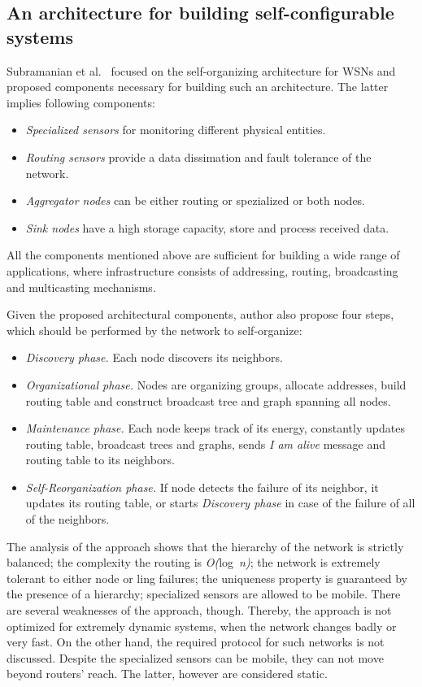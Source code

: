 \subsection{An architecture for building self-configurable systems}

Subramanian et al.~\cite{subramanian00} focused on the self-organizing architecture for WSNs and
proposed components necessary for building such an architecture. The latter
implies following components:

\begin{itemize}
\item \emph{Specialized sensors} for monitoring different physical entities.
\item \emph{Routing sensors} provide a data dissimation and fault tolerance of the network.
\item \emph{Aggregator nodes} can be either routing or spezialized or both nodes.
\item \emph{Sink nodes} have a high storage capacity, store and process received data.
\end{itemize}
All the components mentioned above are sufficient for building a wide range of
applications, where infrastructure consists of addressing, routing, broadcasting
and multicasting mechanisms.

Given the proposed architectural components, author also propose four steps,
which should be performed by the network to self-organize:

\begin{itemize}
\item \emph{Discovery phase.} Each node discovers its neighbors.
\item \emph{Organizational phase.} Nodes are organizing groups, allocate
addresses, build routing table and construct broadcast tree and graph spanning
all nodes.
\item \emph{Maintenance phase.} Each node keeps track of its energy, constantly
updates routing table, broadcast trees and graphs, sends \emph{I am alive}
message and routing table to its neighbors.
\item \emph{Self-Reorganization phase.} If node detects the failure of its
neighbor, it updates its routing table, or starts \emph{Discovery phase} in case
of the failure of all of the neighbors.
\end{itemize}

The analysis of the approach shows that the hierarchy of the network is strictly
balanced; the complexity the routing is \emph{O(}log~\emph{n)}; the network is
extremely tolerant to either node or ling failures; the uniqueness property is
guaranteed by the presence of a hierarchy; specialized sensors are allowed to be
mobile. There are several weaknesses of the approach, though. Thereby,
the approach is not optimized for extremely dynamic systems, when the network
changes badly or very fast. On the other hand, the required protocol for such
networks is not discussed. Despite the specialized sensors can be mobile, they
can not move beyond routers' reach. The latter, however are considered static.
